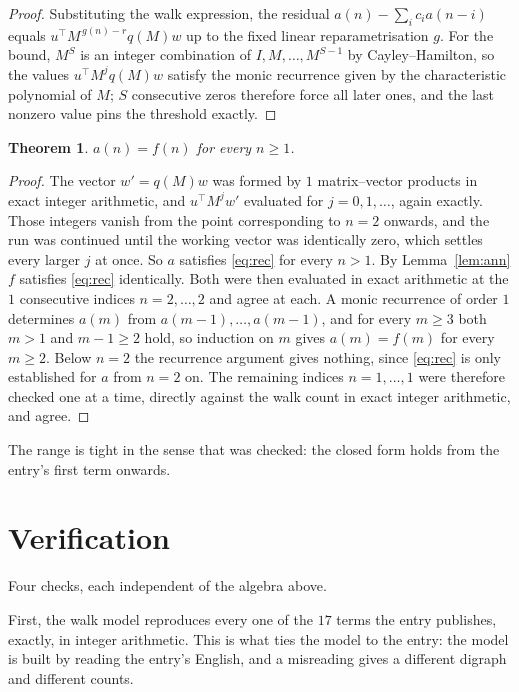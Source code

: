 \documentclass[11pt,a4paper]{article}
\theoremstyle{plain}
\newtheorem{theorem}{Theorem}
\theoremstyle{definition}
\begin{document}
\begin{proof}
Substituting the walk expression, the residual $a(n)-\sum_ic_ia(n-i)$ equals
$u^{\!\top}M^{\,g(n)-r}q(M)w$ up to the fixed linear reparametrisation $g$. For the bound,
$M^{S}$ is an integer combination of $I,M,\dots,M^{S-1}$ by Cayley--Hamilton, so the values
$u^{\!\top}M^{j}q(M)w$ satisfy the monic recurrence given by the characteristic polynomial of
$M$; $S$ consecutive zeros therefore force all later ones, and the last nonzero value pins the
threshold exactly.
\end{proof}

\begin{theorem}
$a(n)=f(n)$ for every $n\ge1$.
\end{theorem}

\begin{proof}
The vector $w'=q(M)w$ was formed by $1$ matrix--vector products in exact integer
arithmetic, and $u^{\!\top}M^{j}w'$ evaluated for $j=0,1,\dots$, again exactly. Those integers
vanish from the point corresponding to $n=2$ onwards, and the run was continued until the
working vector was identically zero, which settles every larger $j$ at once. So $a$ satisfies
\eqref{eq:rec} for every $n>1$. By Lemma~\ref{lem:ann} $f$ satisfies \eqref{eq:rec}
identically. Both were then evaluated in exact arithmetic at the $1$ consecutive indices
$n=2,\dots,2$ and agree at each. A monic recurrence of order $1$
determines $a(m)$ from $a(m-1),\dots,a(m-1)$, and for every $m\ge3$ both
$m>1$ and $m-1\ge2$ hold, so induction on $m$ gives $a(m)=f(m)$ for every
$m\ge2$.
Below $n=2$ the recurrence argument gives nothing, since \eqref{eq:rec} is only
established for $a$ from $n=2$ on. The remaining indices $n=1,\dots,1$ were
therefore checked one at a time, directly against the walk count in exact integer arithmetic,
and agree.
\end{proof}

The range is tight in the sense that was checked: the closed form holds from the entry's first term onwards.

\section{Verification}

Four checks, each independent of the algebra above.

First, the walk model reproduces every one of the $17$ terms the entry publishes,
exactly, in integer arithmetic. This is what ties the model to the entry: the model is built
by reading the entry's English, and a misreading gives a different digraph and different
counts.
\end{document}
